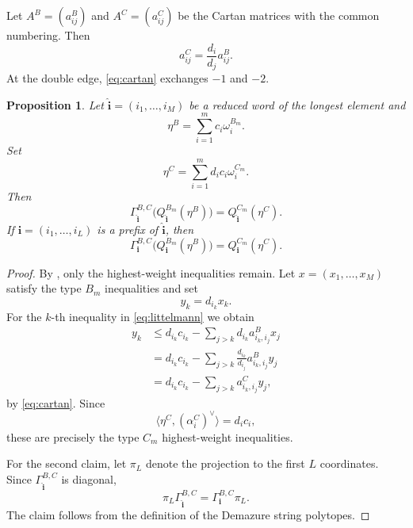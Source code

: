 \documentclass[a4paper, 12pt]{amsart}
\newtheorem{proposition}[theorem]{Proposition}
\begin{document}
Let $A^B=(a^B_{ij})$ and $A^C=(a^C_{ij})$ be the Cartan matrices with the common numbering. Then
\begin{equation}\label{eq:cartan}
                     a^C_{ij}=\frac{d_i}{d_j}a^B_{ij}.
\end{equation}
At the double edge, \eqref{eq:cartan} exchanges $-1$ and $-2$.

\begin{proposition}\label{prop:weighted}
Let $\widehat{\mathbf i}=(i_1,\ldots,i_M)$ be a reduced word of the longest element and
\[
                    \eta^B=\sum_{i=1}^m c_i\omega_i^{B_m}.
\]
Set
\[
                    \eta^C=\sum_{i=1}^m d_ic_i\omega_i^{C_m}.
\]
Then
\[
 \Gamma_{\widehat{\mathbf i}}^{B,C}
 \bigl(Q_{\widehat{\mathbf i}}^{B_m}(\eta^B)\bigr)
 =
 Q_{\widehat{\mathbf i}}^{C_m}(\eta^C).
\]
If $\mathbf i=(i_1,\ldots,i_L)$ is a prefix of $\widehat{\mathbf i}$, then
\[
 \Gamma_{\mathbf i}^{B,C}
 \bigl(Q_{\mathbf i}^{B_m}(\eta^B)\bigr)
 =
 Q_{\mathbf i}^{C_m}(\eta^C).
\]
\end{proposition}

\begin{proof}
By \cite[Theorem~3.2]{CFL25}, only the highest-weight inequalities remain. Let $x=(x_1,\ldots,x_M)$ satisfy the type $B_m$ inequalities and set
\[
                         y_k=d_{i_k}x_k.
\]
For the $k$-th inequality in \eqref{eq:littelmann} we obtain
\begin{align*}
 y_k
 &\leq d_{i_k}c_{i_k}
      -\sum_{j>k}d_{i_k}a^B_{i_k,i_j}x_j\\
 &=d_{i_k}c_{i_k}
      -\sum_{j>k}\frac{d_{i_k}}{d_{i_j}}a^B_{i_k,i_j}y_j\\
 &=d_{i_k}c_{i_k}
      -\sum_{j>k}a^C_{i_k,i_j}y_j,
\end{align*}
by \eqref{eq:cartan}. Since
\[
 \langle\eta^C,(\alpha_i^C)^\vee\rangle=d_ic_i,
\]
these are precisely the type $C_m$ highest-weight inequalities.

For the second claim, let $\pi_L$ denote the projection to the first
$L$ coordinates. Since $\Gamma_{\widehat{\mathbf i}}^{B,C}$ is diagonal,
\[
 \pi_L\Gamma_{\widehat{\mathbf i}}^{B,C}
   =\Gamma_{\mathbf i}^{B,C}\pi_L.
\]
The claim follows from the definition of the Demazure string polytopes.
\end{proof}
\end{document}
